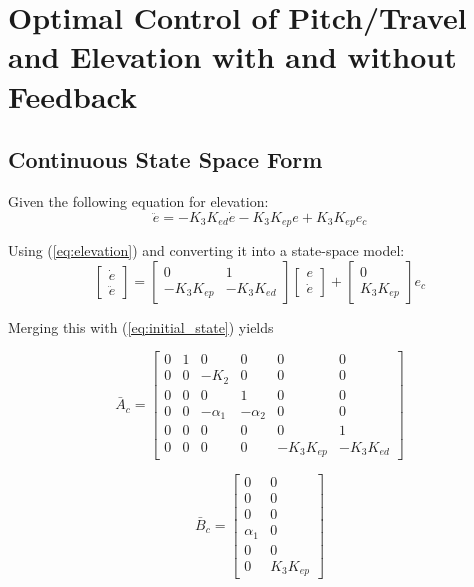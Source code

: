 
\section{Optimal Control of Pitch/Travel and Elevation with and without Feedback}
\subsection{Continuous State Space Form}
Given the following equation for elevation:
\begin{equation}\label{eq:elevation}
\ddot{e} = -K_3K_{ed}\dot{e} - K_3K_{ep}e +K_3K_{ep}e_c
\end{equation}

Using (\ref{eq:elevation}) and converting it into a state-space model:
$$
\begin{bmatrix}
\dot{e} \\
\ddot{e}
\end{bmatrix} = \begin{bmatrix}
0 & 1 \\
-K_3K_{ep} & -K_3K_{ed}
\end{bmatrix}\begin{bmatrix}
e \\
\dot{e}
\end{bmatrix}
+\begin{bmatrix}
0 \\
K_3K_{ep}
\end{bmatrix}e_c
$$

Merging this with (\ref{eq:initial_state}) yields

\begin{equation}
\bar{A}_c =
\begin{bmatrix}
    0 & 1 & 0 & 0 & 0 & 0 \\
    0 & 0 & -K_2 & 0 & 0 & 0 \\
    0 & 0 & 0 & 1 & 0 & 0 \\
    0 & 0 & -\alpha_1 & - \alpha_2 & 0 & 0 \\
    0 & 0 & 0 & 0 & 0 & 1 \\
    0 & 0 & 0 & 0 & -K_3K_{ep} & -K_3K_{ed}
\end{bmatrix}
\end{equation}

\begin{equation}
\bar{B}_c =
\begin{bmatrix}
    0 & 0\\
    0 & 0 \\
    0 & 0 \\
    \alpha_1 & 0 \\
    0 & 0 \\
    0 & K_3K_{ep}
\end{bmatrix}
\end{equation}

